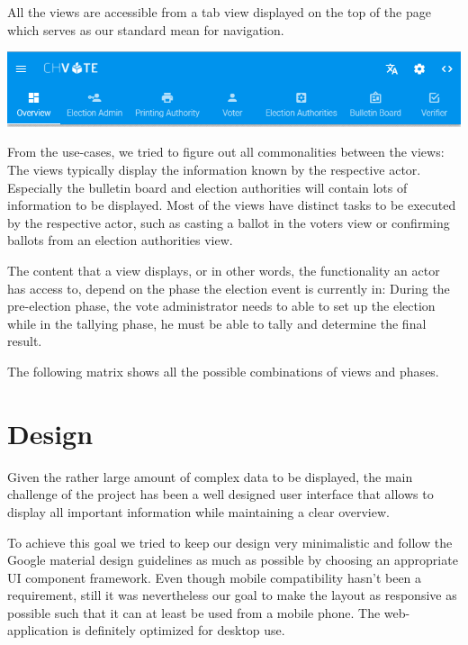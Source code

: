 All the views are accessible from a tab view displayed on the top of the page which serves as our standard mean for navigation.

\begin{center}
\includegraphics[scale=0.75]{assets/screenshots/navigation.png}
\label{Phases of an election-event}%
\end{center}

From the use-cases, we tried to figure out all commonalities between the views: The views typically display the information known by the respective actor. Especially the bulletin board and election authorities will contain lots of information to be displayed. Most of the views have distinct tasks to be executed by the respective actor, such as casting a ballot in the voters view or confirming ballots from an election authorities view.

The content that a view displays, or in other words, the functionality an actor has access to, depend on the phase the election event is currently in: During the pre-election phase, the vote administrator needs to able to set up the election while in the tallying phase, he must be able to tally and determine the final result.


The following matrix shows all the possible combinations of views and phases.

\section{Design}
Given the rather large amount of complex data to be displayed, the main challenge of the project has been a well designed user interface that allows to display all important information while maintaining a clear overview.

To achieve this goal we tried to keep our design very minimalistic and follow the Google material design guidelines as much as possible by choosing an appropriate UI component framework. Even though mobile compatibility hasn't been a requirement, still it was nevertheless our goal to make the layout as responsive as possible such that it can at least be used from a mobile phone. The web-application is definitely optimized for desktop use.

